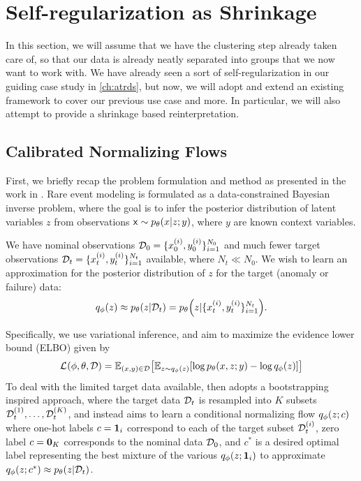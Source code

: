 \section{Self-regularization as Shrinkage}

In this section, we will assume that we have the clustering step already taken care of, so that our data is already neatly separated into groups that we now want to work with. We have already seen a sort of self-regularization in our guiding case study in \cref{ch:atrds}, but now, we will adopt and extend an existing framework to cover our previous use case and more. In particular, we will also attempt to provide a shrinkage based reinterpretation.

\subsection{Calibrated Normalizing Flows}

First, we briefly recap the problem formulation and method as presented in the \CALNF{} work in \cite{dawson2025rare}. Rare event modeling is formulated as a data-constrained Bayesian inverse problem, where the goal is to infer the posterior distribution of latent variables $z$ from observations $\rx\sim \pld{x\given z;y}$, where $y$ are known context variables. 

\begin{example}
    We have nominal observations $\mathcal D_0 = \{x_0^{(i)}, y_0^{(i)}\}_{i=1}^{N_0}$ and much fewer target observations $\mathcal D_t = \{x_t^{(i)}, y_t^{(i)}\}_{i=1}^{N_t}$ available, where $N_t \ll N_0$. We wish to learn an approximation for the posterior distribution of $z$ for the target (anomaly or failure) data:
    \begin{equation}
        \qvd{z} \approx \pld{z\given \Data_t} = \pld{z\given \{x_t^{(i)}, y_t^{(i)}\}_{i=1}^{N_t}}.
    \end{equation}
\end{example}

Specifically, we use variational inference, and aim to maximize the evidence lower bound (ELBO) given by
\begin{equation}
    \elbo{}{\phi, \theta, \Data} = \EX{(x,y)\in \Data}{ \EX{z\sim \qvd{z}}{\log\pld{x,z;y}-\log\qvd{z}} }
\end{equation}
To deal with the limited target data available, \CALNF{} then adopts a bootstrapping inspired approach, where the target data $\mathcal D_t$ is resampled into $K$ subsets $\mathcal D_t^{(1)},\ldots,\mathcal D_t^{(K)}$, and instead aims to learn a conditional normalizing flow $\qvd{z;c}$ where one-hot labels $c=\mathbf{1}_i$ correspond to each of the target subset $\mathcal D_t^{(i)}$, zero label $c=\mathbf{0}_K$ corresponds to the nominal data $\mathcal D_0$, and $c^*$ is a desired optimal label representing the best mixture of the various $\qvd{z;\vone_i}$ to approximate $\qvd{z;c^*}\approx \pld{z\given \Data_t}$. 

